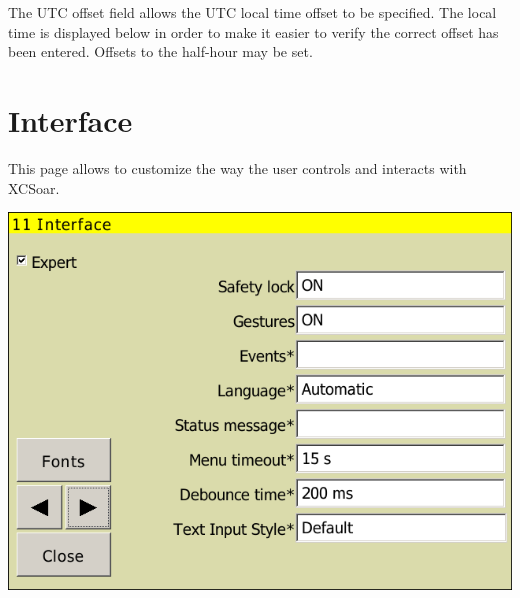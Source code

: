 The UTC offset field allows the UTC local time offset to be specified.
The local time is displayed below in order to make it easier to verify
the correct offset has been entered.  Offsets to the half-hour may be
set.



\clearpage
\section{Interface}\label{sec:interface}

This page allows to customize the way the user controls and interacts with
XCSoar.

\begin{center}
\includegraphics[angle=0,width=0.8\linewidth,keepaspectratio='true']{figures/config-interface.png}
\end{center}

